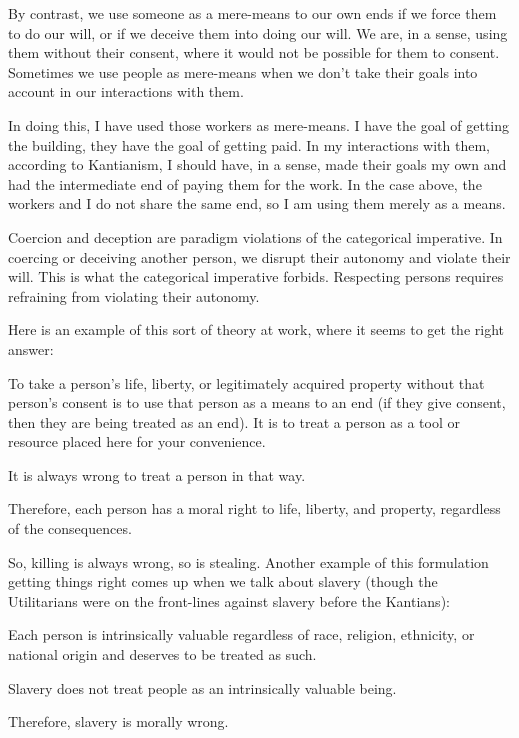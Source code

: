 By contrast, we use someone as a mere-means to our own ends if we force them to do our will, or if we deceive them into doing our will. We are, in a sense, using them without their consent, where it would not be possible for them to consent. Sometimes we use people as mere-means when we don't take their goals into account in our interactions with them.


In doing this, I have used those workers as mere-means. I have the goal of getting the building, they have the goal of getting paid. In my interactions with them, according to Kantianism, I should have, in a sense, made their goals my own and had the intermediate end of paying them for the work. In the case above, the workers and I do not share the same end, so I am using them merely as a means.

Coercion and deception are paradigm violations of the categorical imperative. In coercing or deceiving another person, we disrupt their autonomy and violate their will. This is what the categorical imperative forbids. Respecting persons requires refraining from violating their autonomy.

Here is an example of this sort of theory at work, where it seems to get the right answer:
\begin{earg}
    \item[] To take a person’s life, liberty, or legitimately acquired property without that person’s consent is to use that person as a means to an end (if they give consent, then they are being treated as an end). It is to treat a person as a tool or resource placed here for your convenience.
    \item[] It is always wrong to treat a person in that way.
    \item[] Therefore, each person has a moral right to life, liberty, and property, regardless of the consequences.
\end{earg}
So, killing is always wrong, so is stealing. Another example of this formulation getting things right comes up when we talk about slavery (though the Utilitarians were on the front-lines against slavery before the Kantians):
\begin{earg}
    \item[] Each person is intrinsically valuable regardless of race, religion, ethnicity, or national origin and deserves to be treated as such.
    \item[] Slavery does not treat people as an intrinsically valuable being.
    \item[] Therefore, slavery is morally wrong.
\end{earg}
